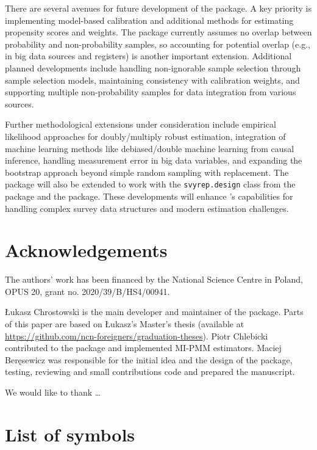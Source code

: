 \documentclass[
]{jss}
\begin{document}
There are several avenues for future development of the 
package. A key priority is implementing model-based calibration and
additional methods for estimating propensity scores and weights. The
package currently assumes no overlap between probability and
non-probability samples, so accounting for potential overlap (e.g., in
big data sources and registers) is another important extension.
Additional planned developments include handling non-ignorable sample
selection through sample selection models, maintaining consistency with
calibration weights, and supporting multiple non-probability samples for
data integration from various sources.

Further methodological extensions under consideration include empirical
likelihood approaches for doubly/multiply robust estimation, integration
of machine learning methods like debiased/double machine learning from
causal inference, handling measurement error in big data variables, and
expanding the bootstrap approach beyond simple random sampling with
replacement. The package will also be extended to work with the
\texttt{svyrep.design} class from the  package and the
 package. These developments will enhance 's
capabilities for handling complex survey data structures and modern
estimation challenges.

\section{Acknowledgements}\label{sec-acknowledgements}

The authors' work has been financed by the National Science Centre in
Poland, OPUS 20, grant no. 2020/39/B/HS4/00941.

Łukasz Chrostowski is the main developer and maintainer of the package.
Parts of this paper are based on Łukasz's Master's thesis (available at
\url{https://github.com/ncn-foreigners/graduation-theses}). Piotr
Chlebicki contributed to the package and implemented MI-PMM estimators.
Maciej Beręsewicz was responsible for the initial idea and the design of
the package, testing, reviewing and small contributions code and
prepared the manuscript.

We would like to thank \ldots{}

\clearpage

\appendix

\section{List of symbols}\label{list-of-symbols}
\end{document}
